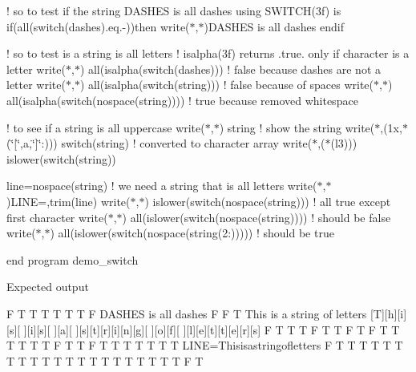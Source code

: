 ! so to test if the string D\+A\+S\+H\+ES is all dashes using S\+W\+I\+T\+C\+H(3f) is if(all(switch(dashes).eq.\textquotesingle{}-\/\textquotesingle{}))then write($\ast$,$\ast$)\textquotesingle{}D\+A\+S\+H\+ES is all dashes\textquotesingle{} endif

! so to test is a string is all letters ! isalpha(3f) returns .true. only if character is a letter write($\ast$,$\ast$) all(isalpha(switch(dashes))) ! false because dashes are not a letter write($\ast$,$\ast$) all(isalpha(switch(string))) ! false because of spaces write($\ast$,$\ast$) all(isalpha(switch(nospace(string)))) ! true because removed whitespace

! to see if a string is all uppercase write($\ast$,$\ast$) string ! show the string write($\ast$,\textquotesingle{}(1x,$\ast$(\char`\"{}\mbox{[}\char`\"{},a,\char`\"{}\mbox{]}\char`\"{}\+:))\textquotesingle{}) switch(string) ! converted to character array write($\ast$,\textquotesingle{}($\ast$(l3))\textquotesingle{}) islower(switch(string))

line=nospace(string) ! we need a string that is all letters write($\ast$,$\ast$)\textquotesingle{}L\+I\+NE=\textquotesingle{},trim(line) write($\ast$,$\ast$) islower(switch(nospace(string))) ! all true except first character write($\ast$,$\ast$) all(islower(switch(nospace(string)))) ! should be false write($\ast$,$\ast$) all(islower(switch(nospace(string(2\+:))))) ! should be true

end program demo\+\_\+switch

Expected output

F T T T T T T F D\+A\+S\+H\+ES is all dashes F F T This is a string of letters \mbox{[}T\mbox{]}\mbox{[}h\mbox{]}\mbox{[}i\mbox{]}\mbox{[}s\mbox{]}\mbox{[} \mbox{]}\mbox{[}i\mbox{]}\mbox{[}s\mbox{]}\mbox{[} \mbox{]}\mbox{[}a\mbox{]}\mbox{[} \mbox{]}\mbox{[}s\mbox{]}\mbox{[}t\mbox{]}\mbox{[}r\mbox{]}\mbox{[}i\mbox{]}\mbox{[}n\mbox{]}\mbox{[}g\mbox{]}\mbox{[} \mbox{]}\mbox{[}o\mbox{]}\mbox{[}f\mbox{]}\mbox{[} \mbox{]}\mbox{[}l\mbox{]}\mbox{[}e\mbox{]}\mbox{[}t\mbox{]}\mbox{[}t\mbox{]}\mbox{[}e\mbox{]}\mbox{[}r\mbox{]}\mbox{[}s\mbox{]} F T T T F T T F T F T T T T T T F T T F T T T T T T T L\+I\+NE=Thisisastringofletters F T T T T T T T T T T T T T T T T T T T T T F T \mbox{\label{namespacem__strings_a1cacb2e45c7e3d7ed4cc1b183c35f323}} 
